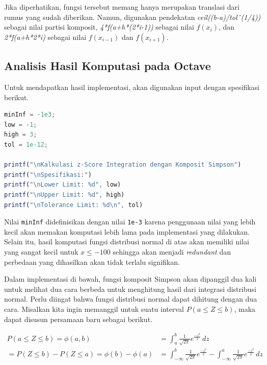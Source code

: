 \documentclass[journal,12pt,onecolumn,a4paper]{IEEEtran}
\begin{document}
Jika diperhatikan, fungsi tersebut memang hanya merupakan translasi dari rumus yang sudah diberikan. Namun, digunakan pendekatan \emph{ceil((b-a)/tolˆ(1/4))} sebagai nilai partisi komposit, \emph{4*f(a+h*(2*i-1))} sebagai nilai \(f(x_{i})\), dan  \emph{2*f(a+h*2*i)} sebagai nilai \(f(x_{i-1})\) dan \(f(x_{i+1})\).

\subsection{Analisis Hasil Komputasi pada Octave}

Untuk mendapatkan hasil implementasi, akan digunakan input dengan spesifikasi berikut.

\begin{center}
	\begin{lstlisting}[language=Octave]
minInf = -1e3;
low = -1;
high = 3;
tol = 1e-12;
		
printf("\nKalkulasi z-Score Integration dengan Komposit Simpson")
printf("\nSpesifikasi:")
printf("\nLower Limit: %d", low)
printf("\nUpper Limit: %d", high)
printf("\nTolerance Limit: %d\n", tol)
	\end{lstlisting}
\end{center}

Nilai \lstinline{minInf} didefinisikan dengan nilai \lstinline{1e-3} karena penggunaan nilai yang lebih kecil akan memakan komputasi lebih lama pada implementasi yang dilakukan. Selain itu, hasil komputasi fungsi distribusi normal di atas akan memiliki nilai yang sangat kecil untuk \(x \le -100\) sehingga akan menjadi \emph{redundant} dan perbedaan yang dihasilkan akan tidak terlalu signifikan.

Dalam implementasi di bawah, fungsi komposit Simpson akan dipanggil dua kali untuk melihat dua cara berbeda untuk menghitung hasil dari integrasi distribusi normal. Perlu diingat bahwa fungsi distribusi normal dapat dihitung dengan dua cara. Misalkan kita ingin memanggil untuk suatu interval \(P(a \le Z \le b)\), maka dapat disusun persamaan baru sebagai berikut.

\begin{equation*}
	\begin{split}
		P(a \le Z \le b )  = \phi(a,b) & = \int_{a}^{b} \frac{1}{\sqrt{2\pi}}e ^{\frac{-z^2}{2}} \,dz \\
		=  P(Z \le b ) - P(Z \le a )  = \phi(b)-\phi(a) & =  \int_{-\infty}^{b} \frac{1}{\sqrt{2\pi}}e ^{\frac{-z^2}{2}} - \int_{-\infty}^{a} \frac{1}{\sqrt{2\pi}}e ^{\frac{-z^2}{2}} \,dz
	\end{split}
\end{equation*}
\end{document}
